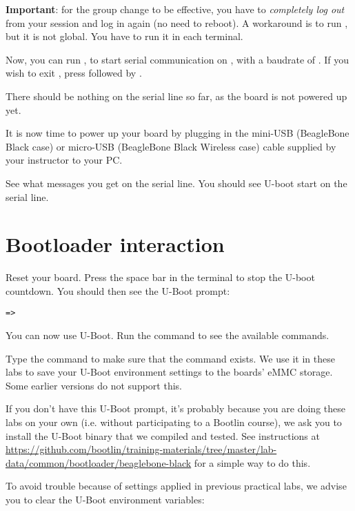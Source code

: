 {\bf Important}: for the group change to be effective, you have to
{\em completely log out} from your session and log in again (no need to
reboot). A workaround is to run , but it is not global.
You have to run it in each terminal.

Now, you can run , to start serial
communication on , with a baudrate of . If
you wish to exit , press \code{[Ctrl][a]} followed by
\code{[Ctrl][x]}.

There should be nothing on the serial line so far, as the board is not
powered up yet.

It is now time to power up your board by plugging in the mini-USB
(BeagleBone Black case) or micro-USB (BeagleBone Black Wireless case)
cable supplied by your instructor to your PC.

See what messages you get on the serial line. You should see U-boot
start on the serial line.

\section{Bootloader interaction}

Reset your board. Press the space bar in the  terminal
to stop the U-boot countdown. You should then see the U-Boot prompt:

\begin{verbatim}
=>
\end{verbatim}

You can now use U-Boot. Run the  command to see the available
commands.

Type the  command to make sure that the
 command exists. We use it in these labs to
save your U-Boot environment settings to the boards' eMMC storage.
Some earlier versions do not support this.

If you don't have this U-Boot prompt, it's probably because you are doing these labs on your own
(i.e. without participating to a Bootlin course), we ask you to install the U-Boot binary
that we compiled and tested. See instructions at
\url{https://github.com/bootlin/training-materials/tree/master/lab-data/common/bootloader/beaglebone-black}
for a simple way to do this.

To avoid trouble because of settings applied in previous practical labs,
we advise you to clear the U-Boot environment variables:

